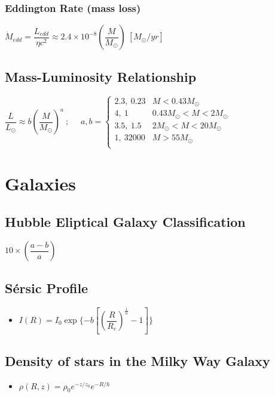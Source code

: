 \subsubsection{Eddington Rate (mass loss)}
\begin{itemize}
\itemt \( \dot{M}_{edd} = \dfrac{L_{edd}}{\eta c^2} \approx 2.4 \times 10^{-8} (\dfrac{M}{M_\odot})\ [M_\odot / yr]\)
\end{itemize}

\subsection{Mass-Luminosity Relationship}
\begin{itemize}
\itemt \( \dfrac{L}{L_\odot} \approx b\left(\dfrac{M}{M_\odot}\right)^a\ ;\ \ \ \ \ \ a, b = \begin{cases} 
      2.3,\ 0.23	& M<0.43M_\odot \\
      4,\ 1			& 0.43M_\odot < M < 2M_\odot \\
      3.5,\ 1.5 	& 2M_\odot < M < 20M_\odot \\
      1,\ 32000 	& M > 55M_\odot \\
   \end{cases}
\)
\end{itemize}


	\section{Galaxies}

\subsection{Hubble Eliptical Galaxy Classification}			
\begin{itemize}
\itemt \( 10 \times \left(\dfrac{a-b}{a}\right) \)
\end{itemize}

\subsection{S\'ersic Profile}
\begin{itemize}
\item \( I(R) = I_0 \exp\{-b[\left(\dfrac{R}{R_e}\right)^\frac{1}{n}-1]\} \)
\end{itemize}

\subsection{Density of stars in the Milky Way Galaxy}
\begin{itemize}
\item \( \rho(R,z) = \rho_0 e^{-z/z_0} e^{-R/h} \)
\end{itemize}

